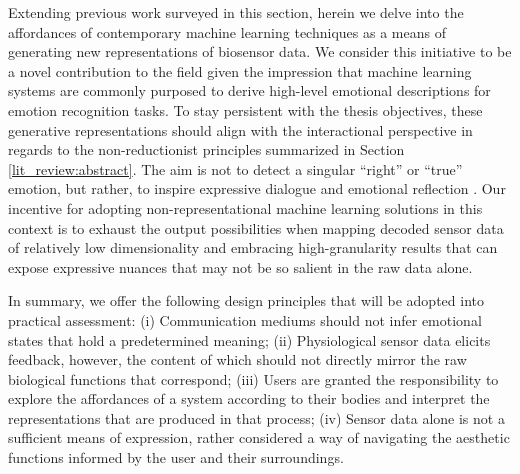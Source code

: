 Extending previous work surveyed in this section, herein we delve into the affordances of contemporary machine learning techniques as a means of generating new representations of biosensor data. We consider this initiative to be a novel contribution to the field given the impression that machine learning systems are commonly purposed to derive high-level emotional descriptions for emotion recognition tasks. To stay persistent with the thesis objectives, these generative representations should align with the interactional perspective in regards to the non-reductionist principles summarized in Section \ref{lit_review:abstract}. The aim is not to detect a singular ``right'' or ``true'' emotion, but rather, to inspire expressive dialogue and emotional reflection \cite{hook_affective_2009}. Our incentive for adopting non-representational machine learning solutions in this context is to exhaust the output possibilities when mapping decoded sensor data of relatively low dimensionality and embracing high-granularity results that can expose expressive nuances that may not be so salient in the raw data alone.

In summary, we offer the following design principles that will be adopted into practical assessment: (i) Communication mediums should not infer emotional states that hold a predetermined meaning; (ii) Physiological sensor data elicits feedback, however, the content of which should not directly mirror the raw biological functions that correspond; (iii) Users are granted the responsibility to explore the affordances of a system according to their bodies and interpret the representations that are produced in that process; (iv) Sensor data alone is not a sufficient means of expression, rather considered a way of navigating the aesthetic functions informed by the user and their surroundings.


